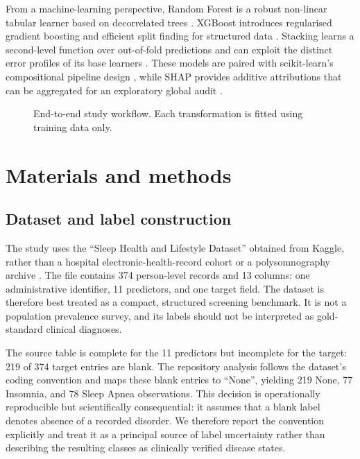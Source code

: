 ﻿\documentclass[preprint,12pt]{elsarticle}
\begin{document}
From a machine-learning perspective, Random Forest is a robust non-linear tabular learner based on decorrelated trees \cite{tabular2022}. XGBoost introduces regularised gradient boosting and efficient split finding for structured data \cite{xgbreview2021}. Stacking learns a second-level function over out-of-fold predictions and can exploit the distinct error profiles of its base learners \cite{stackreview2022,ensemble2021}. These models are paired with scikit-learn's compositional pipeline design \cite{scikit2024}, while SHAP provides additive attributions that can be aggregated for an exploratory global audit \cite{arrieta2020,lundberg2020}.

\begin{figure}[t]
\centering
{}
\caption{End-to-end study workflow. Each transformation is fitted using training data only.}
\label{fig:workflow}
\end{figure}

\section{Materials and methods}
\subsection{Dataset and label construction}
The study uses the ``Sleep Health and Lifestyle Dataset'' obtained from Kaggle, rather than a hospital electronic-health-record cohort or a polysomnography archive \cite{kaggle_sleep}. The file contains 374 person-level records and 13 columns: one administrative identifier, 11 predictors, and one target field. The dataset is therefore best treated as a compact, structured screening benchmark. It is not a population prevalence survey, and its labels should not be interpreted as gold-standard clinical diagnoses.

The source table is complete for the 11 predictors but incomplete for the target: 219 of 374 target entries are blank. The repository analysis follows the dataset's coding convention and maps these blank entries to ``None'', yielding 219 None, 77 Insomnia, and 78 Sleep Apnea observations. This decision is operationally reproducible but scientifically consequential: it assumes that a blank label denotes absence of a recorded disorder. We therefore report the convention explicitly and treat it as a principal source of label uncertainty rather than describing the resulting classes as clinically verified disease states.
\end{document}
